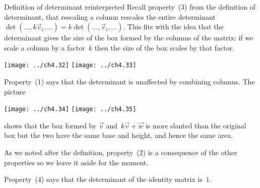 \documentclass[10pt,t,serif,professionalfont]{beamer}
\begin{document}
\begin{frame}{Definition of determinant reinterpreted}
Recall property~(3) from the definition of determinant,
that rescaling a column rescales the entire determinant
$\det(\ldots,k\vec{v}_i,\ldots)=k\det(\ldots,\vec{v}_i,\ldots)$.
This fits with the idea that the determinant
gives the size of the box formed by the columns of the matrix:
if we scale a column by a factor~$k$ then the size of the box
scales by that factor. 
\begin{center}
  \texttt{[image: ../ch4.32]}
  \qquad
  \texttt{[image: ../ch4.33]}
\end{center}

\pause
Property~(1) says that the determinant is unaffected by 
combining columns.
The picture 
\begin{center}
  \texttt{[image: ../ch4.34]}
  \quad
  \texttt{[image: ../ch4.35]}
\end{center}   
shows that the box
formed by $\vec{v}$ and~$k\vec{v}+\vec{w}$ 
is more slanted than the original box but the two have
the same base and height, and hence the same area.
\end{frame}
\begin{frame}
As we noted after the definition, property~(2) is a consequence of the 
other properties so we leave it aside for the moment.  

Property~(4) says that the determinant of the identity matrix is~$1$.
\end{frame}
\end{document}
